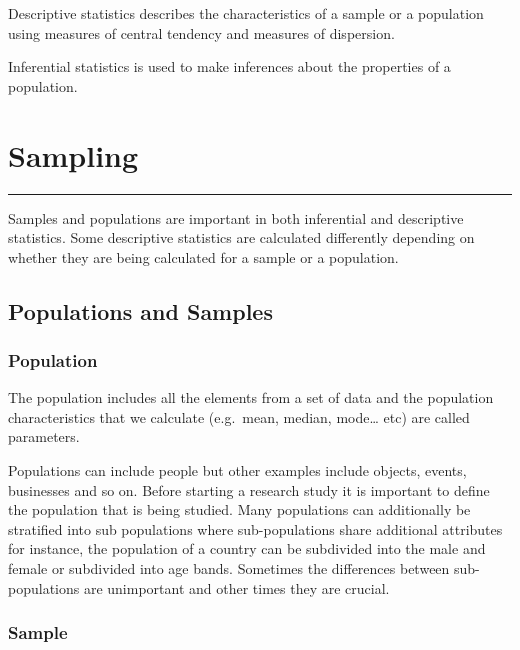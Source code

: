 \documentclass[
]{book}
\begin{document}
Descriptive statistics describes the characteristics of a sample or a population using measures of central tendency and measures of dispersion.

Inferential statistics is used to make inferences about the properties of a population.

\hypertarget{sampling}{%
\chapter{Sampling}\label{sampling}}

\begin{center}\rule{0.5\linewidth}{0.5pt}\end{center}

Samples and populations are important in both inferential and descriptive statistics. Some descriptive statistics are calculated differently depending on whether they are being calculated for a sample or a population.

\hypertarget{populations-and-samples}{%
\section{Populations and Samples}\label{populations-and-samples}}

\hypertarget{population}{%
\subsection{Population}\label{population}}

The population includes all the elements from a set of data and the population characteristics that we calculate (e.g.~mean, median, mode\ldots{} etc) are called parameters.

Populations can include people but other examples include objects, events, businesses and so on. Before starting a research study it is important to define the population that is being studied. Many populations can additionally be stratified into sub populations where sub-populations share additional attributes \citep{Frost2019} for instance, the population of a country can be subdivided into the male and female or subdivided into age bands. Sometimes the differences between sub-populations are unimportant and other times they are crucial.

\hypertarget{sample}{%
\subsection{Sample}\label{sample}}
\end{document}
